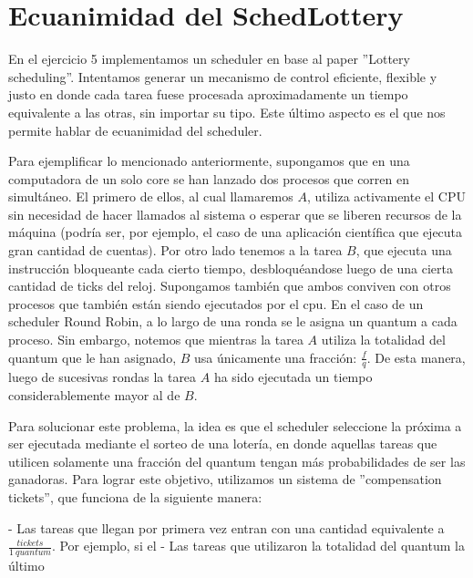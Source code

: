 \section{Ecuanimidad del SchedLottery}

En el ejercicio 5 implementamos un scheduler en base al paper ''Lottery scheduling''. Intentamos generar un mecanismo de control eficiente, flexible y justo en donde cada tarea fuese procesada
aproximadamente un tiempo equivalente a las otras, sin importar su tipo. Este último aspecto es el que nos permite hablar de ecuanimidad del scheduler.

Para ejemplificar lo mencionado anteriormente, supongamos que en una computadora de un solo core se han lanzado dos procesos que corren en simultáneo. El primero de ellos, al cual llamaremos $A$, utiliza
activamente el CPU sin necesidad de hacer llamados al sistema o esperar que se liberen recursos de la máquina (podría ser, por ejemplo, el caso de una aplicación científica que ejecuta gran cantidad de 
cuentas). Por otro lado tenemos a la tarea $B$, que ejecuta una instrucción bloqueante cada cierto tiempo, desbloquéandose luego de una cierta cantidad de ticks del reloj. Supongamos también que ambos conviven
con otros procesos que también están siendo ejecutados por el cpu. En el caso de un scheduler Round Robin, a lo largo de una ronda se le asigna un quantum a cada proceso. Sin embargo, notemos que mientras
la tarea $A$ utiliza la totalidad del quantum que le han asignado, $B$ usa únicamente una fracción: $\frac{f}{q}$. De esta manera, luego de sucesivas rondas la tarea $A$ ha sido ejecutada un tiempo
considerablemente mayor al de $B$.

Para solucionar este problema, la idea es que el scheduler seleccione la próxima a ser ejecutada mediante el sorteo de una lotería, en donde aquellas tareas que utilicen solamente una fracción del quantum
tengan más probabilidades de ser las ganadoras. Para lograr este objetivo, utilizamos un sistema de ''compensation tickets'', que funciona de la siguiente manera:

- Las tareas que llegan por primera vez entran con una cantidad equivalente a $\frac{tickets}{1 \ quantum}$. Por ejemplo, si el 
- Las tareas que utilizaron la totalidad del quantum la último





 
